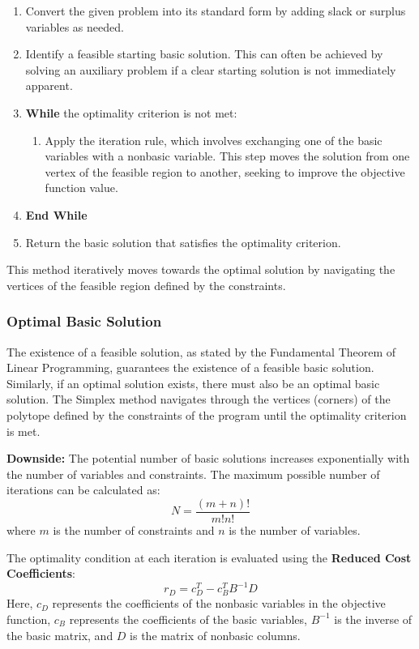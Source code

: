 \documentclass[unicode,11pt,a4paper,oneside,numbers=endperiod,openany]{scrartcl}
\begin{document}
\begin{enumerate}
    \item Convert the given problem into its standard form by adding slack or surplus variables as needed.
    \item Identify a feasible starting basic solution. This can often be achieved by solving an auxiliary problem if a clear starting solution is not immediately apparent.
    \item \textbf{While} the optimality criterion is not met:
    \begin{enumerate}
        \item Apply the iteration rule, which involves exchanging one of the basic variables with a nonbasic variable. This step moves the solution from one vertex of the feasible region to another, seeking to improve the objective function value.
    \end{enumerate}
    \item \textbf{End While}
    \item Return the basic solution that satisfies the optimality criterion.
\end{enumerate}

This method iteratively moves towards the optimal solution by navigating the vertices of the feasible region defined by the constraints.


\subsubsection{Optimal Basic Solution}
The existence of a feasible solution, as stated by the Fundamental Theorem of Linear Programming, guarantees the existence of a feasible basic solution. Similarly, if an optimal solution exists, there must also be an optimal basic solution. The Simplex method navigates through the vertices (corners) of the polytope defined by the constraints of the program until the optimality criterion is met.

\textbf{Downside:} The potential number of basic solutions increases exponentially with the number of variables and constraints. The maximum possible number of iterations can be calculated as:
\[
 N = \frac{(m+n)!}{m!n!}
\]
where \(m\) is the number of constraints and \(n\) is the number of variables.

The optimality condition at each iteration is evaluated using the \textbf{Reduced Cost Coefficients}:
\[
 r_D = c^T_D - c^T_B B^{-1}D
\]
Here, \(c_D\) represents the coefficients of the nonbasic variables in the objective function, \(c_B\) represents the coefficients of the basic variables, \(B^{-1}\) is the inverse of the basic matrix, and \(D\) is the matrix of nonbasic columns.
\end{document}
